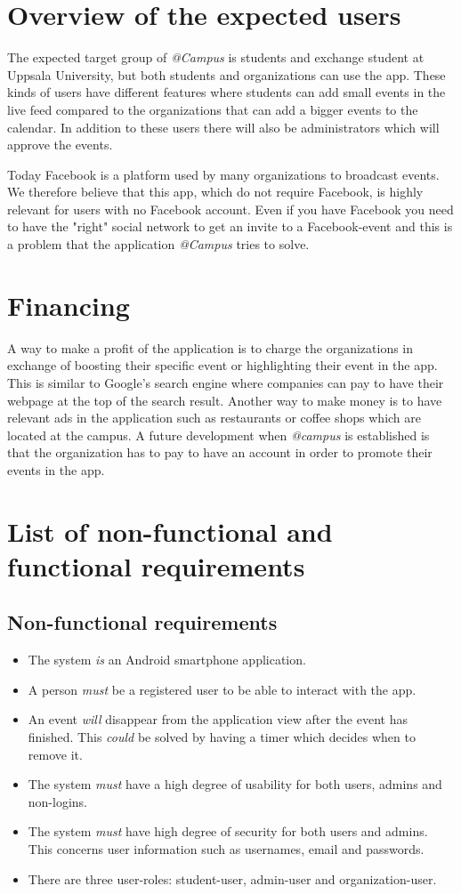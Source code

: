 \documentclass[12pt, oneside]{article}   	%
\begin{document}
\section{Overview of the expected users}
The expected target group of \textit{@Campus} is students and exchange student at Uppsala University, but both students and organizations can use the app. These kinds of users have different features where students can add small events in the live feed compared to the organizations that can add a bigger events to the calendar. In addition to these users there will also be administrators which will approve the events.

Today Facebook is a platform used by many organizations to broadcast events. We therefore believe that this app, which do not require Facebook, is highly relevant for users with no Facebook account. Even if you have Facebook you need to have the "right" social network to get an invite to a Facebook-event and this is a problem that the application \textit{@Campus} tries to solve. 

\section{Financing}
A way to make a profit of the application is to charge the organizations in exchange of  boosting their specific event or highlighting their event in the app. This is similar to Google's search engine where companies can pay to have their webpage at the top of the search result. Another way to make money is to have relevant ads in the application such as restaurants or coffee shops which are located at the campus. A future development when \textit{@campus} is established is that the organization has to pay to have an account in order to promote their events in the app. 

\section{List of non-functional and functional requirements}
\subsection*{Non-functional requirements}
\begin{itemize}
\item The system \textit{is} an Android smartphone application.
\item A person \textit{must} be a registered user to be able to interact with the app. 
\item An event \textit{will} disappear from the application view after the event has finished. This \textit{could} be solved by having a timer which decides when to remove it. 
\item The system \textit{must} have a high degree of usability for both users, admins and non-logins. 
\item The system \textit{must} have high degree of security for both users and admins. This concerns user information such as usernames, email and passwords. 
\item There are three user-roles: student-user, admin-user and organization-user.
\end{itemize}
\end{document}
